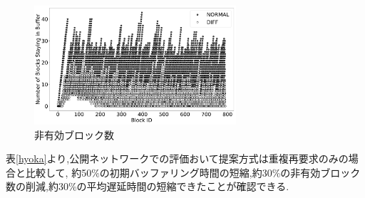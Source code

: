 \documentclass{ltjsarticle}
\begin{document}
\vspace{-8.25mm}
\begin{table}[htb]
	\begin{center}
		\caption{実験結果}
		\label{hyoka}
	\end{center}
\end{table}
\vspace{-11mm}
\begin{figure}[h]
	\centering
	\includegraphics[width=7.5cm]{figure/testNSB.pdf}
	\vspace{-4.5mm}
	\caption{非有効ブロック数}
	\label{testnsb}
\end{figure}
\vspace{-4.5mm}

\hspace{-3.5mm}表\ref{hyoka}より,公開ネットワークでの評価おいて提案方式は重複再要求のみの場合と比較して,
約50\%の初期バッファリング時間の短縮,約30\%の非有効ブロック数の削減,約30\%の平均遅延時間の短縮できたことが確認できる.
\vspace{-8mm}
\end{document}
